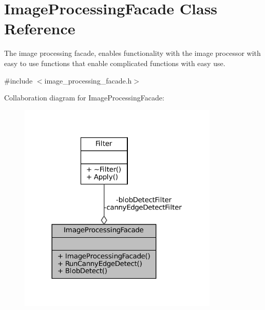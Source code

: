 \hypertarget{classImageProcessingFacade}{}\section{Image\+Processing\+Facade Class Reference}
\label{classImageProcessingFacade}


The image processing facade, enables functionality with the image processor with easy to use functions that enable complicated functions with easy use.  




{\ttfamily \#include $<$image\+\_\+processing\+\_\+facade.\+h$>$}



Collaboration diagram for Image\+Processing\+Facade\+:\nopagebreak
\begin{figure}[H]
\begin{center}
\leavevmode
\includegraphics[width=270pt]{classImageProcessingFacade__coll__graph}
\end{center}
\end{figure}
